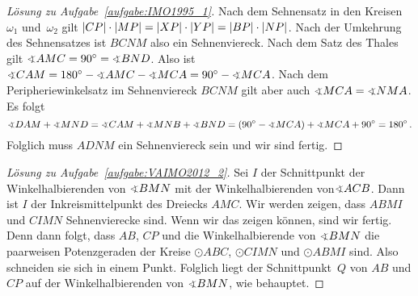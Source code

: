 \begin{proof}[Lösung zu Aufgabe~\ref{aufgabe:IMO1995_1}]
	Nach dem Sehnensatz in den Kreisen $\omega_1$ und~$\omega_2$ gilt $\abs*{CP}\cdot \abs*{MP}=\abs*{XP}\cdot \abs*{YP}=\abs*{BP}\cdot \abs{NP}$. Nach der Umkehrung des Sehnensatzes ist $BCNM$ also ein Sehnenviereck. Nach dem Satz des Thales gilt $\winkel AMC=90^\circ=\winkel BND$. Also ist $\winkel CAM=180^\circ-\winkel AMC-\winkel MCA=90^\circ-\winkel MCA$. Nach dem Peripheriewinkelsatz im Sehnenviereck $BCNM$ gilt aber auch $\winkel MCA=\winkel NMA$. Es folgt
	\begin{equation*}
		\winkel DAM+\winkel MND=\winkel CAM+\winkel MNB+\winkel BND=\parens*{90^\circ-\winkel MCA}+\winkel MCA+90^\circ=180^\circ\,.
	\end{equation*}
	Folglich muss $ADNM$ ein Sehnenviereck sein und wir sind fertig.
\end{proof}
\begin{proof}[Lösung zu Aufgabe~\ref{aufgabe:VAIMO2012_2}]
	Sei $I$ der Schnittpunkt der Winkelhalbierenden von $\winkel BMN$ mit der Winkelhalbierenden von$ \winkel ACB$. Dann ist $I$ der Inkreismittelpunkt des Dreiecks $AMC$. Wir werden zeigen, dass $ABMI$ und $CIMN$ Sehnenvierecke sind. Wenn wir das zeigen können, sind wir fertig. Denn dann folgt, dass $AB$, $CP$ und die Winkelhalbierende von $\winkel BMN$ die paarweisen Potenzgeraden der Kreise $\odot ABC$, $\odot CIMN$ und $\odot ABMI$ sind. Also schneiden sie sich in einem Punkt. Folglich liegt der Schnittpunkt~$Q$ von $AB$ und $CP$ auf der Winkelhalbierenden von $\winkel BMN$, wie behauptet.
	

\end{proof}

